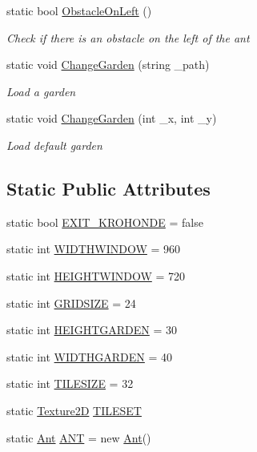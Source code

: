\begin{DoxyCompactItemize}
static bool \mbox{\hyperlink{class_krop_1_1_krohonde_1_1_game_a6bca313b39a9effdc456b6a31f5af50f}{Obstacle\+On\+Left}} ()
\begin{DoxyCompactList}\small\item\em Check if there is an obstacle on the left of the ant \end{DoxyCompactList}\item 
static void \mbox{\hyperlink{class_krop_1_1_krohonde_1_1_game_ac51d3346621871ac6d5d7faff715a067}{Change\+Garden}} (string \+\_\+path)
\begin{DoxyCompactList}\small\item\em Load a garden \end{DoxyCompactList}\item 
static void \mbox{\hyperlink{class_krop_1_1_krohonde_1_1_game_ad89cd94c1649b695992d56fc9da54f35}{Change\+Garden}} (int \+\_\+x, int \+\_\+y)
\begin{DoxyCompactList}\small\item\em Load default garden \end{DoxyCompactList}\end{DoxyCompactItemize}
\subsection*{Static Public Attributes}
\begin{DoxyCompactItemize}
\item 
static bool \mbox{\hyperlink{class_krop_1_1_krohonde_1_1_game_a6a3e7db26ac0b9f80507bf6ea36d4fd2}{E\+X\+I\+T\+\_\+\+K\+R\+O\+H\+O\+N\+DE}} = false
\item 
static int \mbox{\hyperlink{class_krop_1_1_krohonde_1_1_game_a3cff1b81bcc3759e697aa76cee2d758e}{W\+I\+D\+T\+H\+W\+I\+N\+D\+OW}} = 960
\item 
static int \mbox{\hyperlink{class_krop_1_1_krohonde_1_1_game_ad75f5df73247858cd812bdeebb40d39e}{H\+E\+I\+G\+H\+T\+W\+I\+N\+D\+OW}} = 720
\item 
static int \mbox{\hyperlink{class_krop_1_1_krohonde_1_1_game_ae73d97c0f81728f4ff142d36ab9dde4d}{G\+R\+I\+D\+S\+I\+ZE}} = 24
\item 
static int \mbox{\hyperlink{class_krop_1_1_krohonde_1_1_game_a248438b8c8aa03b448ccf9203b0754e7}{H\+E\+I\+G\+H\+T\+G\+A\+R\+D\+EN}} = 30
\item 
static int \mbox{\hyperlink{class_krop_1_1_krohonde_1_1_game_a2e5966eba694146acb742074bd5d9ae3}{W\+I\+D\+T\+H\+G\+A\+R\+D\+EN}} = 40
\item 
static int \mbox{\hyperlink{class_krop_1_1_krohonde_1_1_game_a1351c196ec69b91703900e09a713f49a}{T\+I\+L\+E\+S\+I\+ZE}} = 32
\item 
static \mbox{\hyperlink{class_krop_1_1_krohonde_1_1_texture2_d}{Texture2D}} \mbox{\hyperlink{class_krop_1_1_krohonde_1_1_game_a58093d75ef6e73acbff1eb82c77cd9b9}{T\+I\+L\+E\+S\+ET}}
\item 
static \mbox{\hyperlink{class_krop_1_1_krohonde_1_1_ant}{Ant}} \mbox{\hyperlink{class_krop_1_1_krohonde_1_1_game_a985a69e1fe6b1e94b969ed3cffcc0ca4}{A\+NT}} = new \mbox{\hyperlink{class_krop_1_1_krohonde_1_1_ant}{Ant}}()
\end{DoxyCompactItemize}
